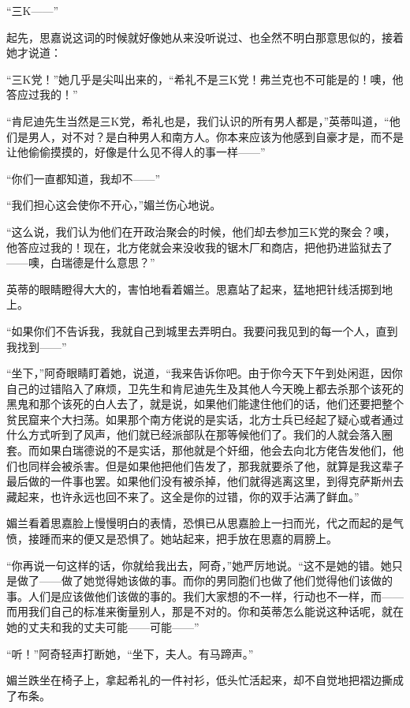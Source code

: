 \par “三K——”
\par 起先，思嘉说这词的时候就好像她从来没听说过、也全然不明白那意思似的，接着她才说道：
\par “三K党！”她几乎是尖叫出来的，“希礼不是三K党！弗兰克也不可能是的！噢，他答应过我的！”
\par “肯尼迪先生当然是三K党，希礼也是，我们认识的所有男人都是，”英蒂叫道，“他们是男人，对不对？是白种男人和南方人。你本来应该为他感到自豪才是，而不是让他偷偷摸摸的，好像是什么见不得人的事一样——”
\par “你们一直都知道，我却不——”
\par “我们担心这会使你不开心，”媚兰伤心地说。
\par “这么说，我们认为他们在开政治聚会的时候，他们却去参加三K党的聚会？噢，他答应过我的！现在，北方佬就会来没收我的锯木厂和商店，把他扔进监狱去了——噢，白瑞德是什么意思？”
\par 英蒂的眼睛瞪得大大的，害怕地看着媚兰。思嘉站了起来，猛地把针线活掷到地上。
\par “如果你们不告诉我，我就自己到城里去弄明白。我要问我见到的每一个人，直到我找到——”
\par “坐下，”阿奇眼睛盯着她，说道，“我来告诉你吧。由于你今天下午到处闲逛，因你自己的过错陷入了麻烦，卫先生和肯尼迪先生及其他人今天晚上都去杀那个该死的黑鬼和那个该死的白人去了，就是说，如果他们能逮住他们的话，他们还要把整个贫民窟来个大扫荡。如果那个南方佬说的是实话，北方士兵已经起了疑心或者通过什么方式听到了风声，他们就已经派部队在那等候他们了。我们的人就会落入圈套。而如果白瑞德说的不是实话，那他就是个奸细，他会去向北方佬告发他们，他们也同样会被杀害。但是如果他把他们告发了，那我就要杀了他，就算是我这辈子最后做的一件事也罢。如果他们没有被杀掉，他们就得逃离这里，到得克萨斯州去藏起来，也许永远也回不来了。这全是你的过错，你的双手沾满了鲜血。”
\par 媚兰看着思嘉脸上慢慢明白的表情，恐惧已从思嘉脸上一扫而光，代之而起的是气愤，接踵而来的便又是恐惧了。她站起来，把手放在思嘉的肩膀上。
\par “你再说一句这样的话，你就给我出去，阿奇，”她严厉地说。“这不是她的错。她只是做了——做了她觉得她该做的事。而你的男同胞们也做了他们觉得他们该做的事。人们是应该做他们该做的事的。我们大家想的不一样，行动也不一样，而——而用我们自己的标准来衡量别人，那是不对的。你和英蒂怎么能说这种话呢，就在她的丈夫和我的丈夫可能——可能——”
\par “听！”阿奇轻声打断她，“坐下，夫人。有马蹄声。”
\par 媚兰跌坐在椅子上，拿起希礼的一件衬衫，低头忙活起来，却不自觉地把褶边撕成了布条。
